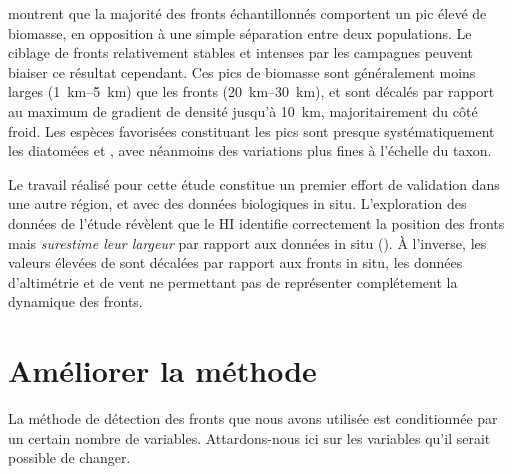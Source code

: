 
\Textcite{mangolte_2023} montrent que la majorité des fronts échantillonnés comportent un pic élevé de biomasse, en opposition à une simple séparation entre deux populations.
Le ciblage de fronts relativement stables et intenses par les campagnes peuvent biaiser ce résultat cependant.
Ces pics de biomasse sont généralement moins larges (\qtyrange{1}{5}{\km}) que les fronts (\qtyrange{20}{30}{\km}), et sont décalés par rapport au maximum de gradient de densité jusqu'à \qty{10}{\km}, majoritairement du côté froid.
Les espèces favorisées constituant les pics sont presque systématiquement les diatomées et , avec néanmoins des variations plus fines à l'échelle du taxon.

Le travail réalisé pour cette étude  constitue un premier effort de validation dans une autre région, et avec des données biologiques in situ.
L'exploration des données de l'étude révèlent que le HI identifie correctement la position des fronts mais \emph{surestime leur largeur} par rapport aux données in situ ().
À l'inverse, les valeurs élevées de  sont décalées par rapport aux fronts in situ, les données d'altimétrie et de vent ne permettant pas de représenter complétement la dynamique des fronts.

\begin{figure}
  \centering
  \label{fig:comp-hi-fsle}
\end{figure}

\section{Améliorer la méthode}

La méthode de détection des fronts que nous avons utilisée  est conditionnée par un certain nombre de variables.
Attardons-nous ici sur les variables qu'il serait possible de changer.

